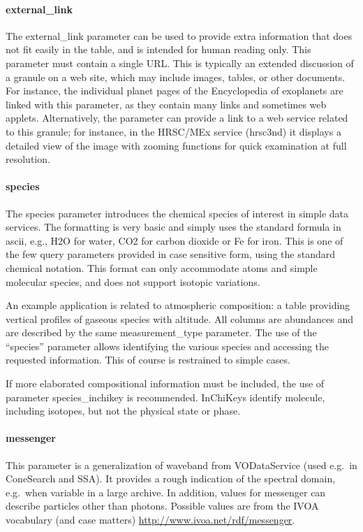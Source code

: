 \documentclass[11pt,a4paper]{ivoa}
\begin{document}
\paragraph{external\_link}

The external\_link parameter can be used to provide extra information
that does not fit easily in the table, and is intended for human reading
only. This parameter must contain a single URL. This is typically an
extended discussion of a granule on a web site, which may include images,
tables, or other documents. For instance, the individual planet pages of
the Encyclopedia of exoplanets are linked with this parameter, as they
contain many links and sometimes web applets. Alternatively, the parameter
can provide a link to a web service related to this granule; for instance,
in the HRSC/MEx service (hrsc3nd) it displays a detailed view of the
image with zooming functions for quick examination at full resolution.

\paragraph{species}

The species parameter introduces the chemical species of interest in
simple data services. The formatting is very basic and simply uses the
standard formula in ascii, e.g., H2O for water, CO2 for carbon dioxide
or Fe for iron. This is one of the few query parameters provided in
case sensitive form, using the standard chemical notation. This format
can only accommodate atoms and simple molecular species, and does not
support isotopic variations.

An example application is related to atmospheric composition:
a table providing vertical profiles of gaseous species with altitude.
All columns are abundances and are described by the same measurement\_type
parameter. The use of the ``species'' parameter allows identifying the
various species and accessing the requested information. This of course
is restrained to simple cases.

If more elaborated compositional information must be included, the use of
parameter species\_inchikey is recommended. InChiKeys identify molecule,
including isotopes, but not the physical state or phase.

\paragraph{messenger}

This parameter is a generalization of waveband from VODataService
(used e.g.\ in ConeSearch and SSA). It provides a rough indication
of the spectral domain, e.g.\ when variable in a large archive. In
addition, values for messenger can describe particles other than
photons. Possible values are from the IVOA vocabulary (and case matters)
\url{http://www.ivoa.net/rdf/messenger}.
\end{document}
